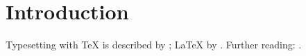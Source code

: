 \chapter{Introduction}\label{ch:intro}
Typesetting with \TeX{} is described by \citet{knuth84}; \LaTeX{} by \citet{lamport94}.
Further reading: \citep{goossens97,mittelbach04}.
